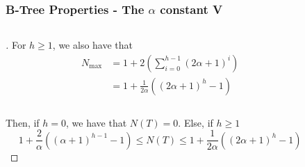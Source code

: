 \documentclass{beamer}
\begin{document}
\begin{frame}
    \frametitle{B-Tree Properties - The \(\alpha\) constant V}
    \begin{columns}
        \begin{column}{\textlecolumn}
            \begin{block}{}
                \begin{proof}[\unskip\nopunct]
                    For \(h \geq 1\), we also have that
                    \[
                        \begin{aligned}
                            N_{\text{max}} &= 1 + 2\left(\sum^{h - 1}_{i = 0} \left(2\alpha + 1\right)^i \right) \\
                            &= 1 + \frac{1}{2\alpha}\left(\left(2\alpha + 1\right)^{h} - 1\right) \\
                        \end{aligned}
                    \]
                    \\
                    Then, if \(h = 0\), we have that \(N\left(T\right) = 0\). Else, if \(h \geq 1\)
                    \[
                        1 + \frac{2}{\alpha}\left(\left(\alpha + 1\right)^{h - 1} - 1\right) 
                        \leq 
                        N\left(T\right) 
                        \leq 
                        1 + \frac{1}{2\alpha}\left(\left(2\alpha + 1\right)^{h} - 1\right)
                        \tag{Nodes Bounds}\label{btree-nodes-num}
                    \]
                \end{proof}
            \end{block}
        \end{column}
        \begin{column}{\textricolumn}
        \end{column}
    \end{columns}
\end{frame}
\end{document}
